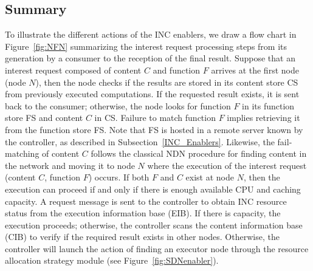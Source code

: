 \subsection{Summary}\label{summaryEnablers}
\noindent To illustrate the different actions of the INC enablers, we draw a flow chart in Figure~\ref{fig:NFN} summarizing the interest request processing steps from its generation by a consumer to the reception of the final result. 
Suppose that an interest request composed of content $C$ and function $F$ arrives at the first node (node $N$), then the node checks if the results are stored in its content store CS from previously executed computations. If the requested result exists, it is sent back to the consumer; otherwise, the node looks for function $F$ in its function store FS and content $C$ in CS. 
Failure to match function $F$ implies retrieving it from the function store FS. Note that FS is hosted in a remote server known by the controller, as described in Subsection~\ref{INC_Enablers}. 
Likewise, the fail-matching of content $C$ follows the classical NDN procedure for finding content in the network and moving it to node $N$ where the execution of the interest request (content $C$, function $F$) occurs. 
If both $F$ and $C$ exist at node $N$, then the execution can proceed if and only if there is enough available CPU and caching capacity. A request message is sent to the controller to obtain INC resource status from the execution information base (EIB). If there is capacity, the execution proceeds; otherwise, the controller scans the content information base (CIB) to verify if the required result exists in other nodes. Otherwise, the controller will launch the action of finding an executor node through the resource allocation strategy module (see Figure~\ref{fig:SDNenabler}).
